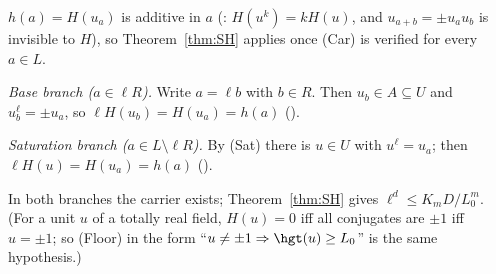 $h(a)=H(u_a)$ is additive in $a$ (: $H(u^k)=kH(u)$, and $u_{a+b}=\pm u_au_b$ is invisible to $H$), so Theorem~\ref{thm:SH} applies once (Car) is verified for every $a\in L$.

\emph{Base branch ($a\in\ell R$).} Write $a=\ell b$ with $b\in R$. Then $u_b\in A\subseteq U$ and $u_b^{\ell}=\pm u_a$, so $\ell H(u_b)=H(u_a)=h(a)$ ().

\emph{Saturation branch ($a\in L\setminus\ell R$).} By (Sat) there is $u\in U$ with $u^{\ell}=u_a$; then $\ell H(u)=H(u_a)=h(a)$ ().

In both branches the carrier exists; Theorem~\ref{thm:SH} gives $\ell^{d}\le K_mD/L_0^{m}$. (For a unit $u$ of a totally real field, $H(u)=0$ iff all conjugates are $\pm1$ iff $u=\pm1$; so (Floor) in the form ``$u\ne\pm1\Rightarrow\hgt(u)\ge L_0$'' is the same hypothesis.)
